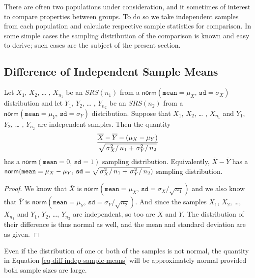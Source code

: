 There are often two populations under consideration, and it sometimes
of interest to compare properties between groups. To do so we take
independent samples from each population and calculate respective
sample statistics for comparison. In some simple cases the sampling
distribution of the comparison is known and easy to derive; such cases
are the subject of the present section.

\subsection{Difference of Independent Sample Means}
\label{sec-8-4-1}

\begin{prop}
Let \(X_{1}\), \(X_{2}\), \ldots{} , \(X_{n_{1}}\) be an \(SRS(n_{1})\)
from a
\(\mathsf{norm}(\mathtt{mean}=\mu_{X},\,\mathtt{sd}=\sigma_{X})\)
distribution and let \(Y_{1}\), \(Y_{2}\), \ldots{} , \(Y_{n_{2}}\) be an
\(SRS(n_{2})\) from a
\(\mathsf{norm}(\mathtt{mean}=\mu_{Y},\,\mathtt{sd}=\sigma_{Y})\)
distribution. Suppose that \(X_{1}\), \(X_{2}\), \ldots{} , \(X_{n_{1}}\)
and \(Y_{1}\), \(Y_{2}\), \ldots{} , \(Y_{n_{2}}\) are independent
samples. Then the quantity
\begin{equation}
\label{eq-diff-indep-sample-means}
\frac{\overline{X}-\overline{Y}-(\mu_{X}-\mu_{Y})}{\sqrt{\left.\sigma_{X}^{2}\right/ n_{1}+\left.\sigma_{Y}^{2}\right/ n_{2}}}
\end{equation}
has a \(\mathsf{norm}(\mathtt{mean}=0,\,\mathtt{sd}=1)\) sampling
distribution. Equivalently, \(\overline{X}-\overline{Y}\) has a
\(\mathsf{norm}(\mathtt{mean}=\mu_{X}-\mu_{Y},\,\mathtt{sd}=\sqrt{\left.\sigma_{X}^{2}\right/
n_{1}+\left.\sigma_{Y}^{2}\right/ n_{2}})\) sampling distribution.
\end{prop}

\begin{proof}
We know that \(\overline{X}\) is
\(\mathsf{norm}(\mathtt{mean}=\mu_{X},\,\mathtt{sd}=\sigma_{X}/\sqrt{n_{1}})\)
and we also know that \(\overline{Y}\) is
\(\mathsf{norm}(\mathtt{mean}=\mu_{Y},\,\mathtt{sd}=\sigma_{Y}/\sqrt{n_{2}})\). And
since the samples \(X_{1}\), \(X_{2}\), \ldots{}, \(X_{n_{1}}\) and
\(Y_{1}\), \(Y_{2}\), \ldots{}, \(Y_{n_{2}}\) are independent, so too are
\(\overline{X}\) and \(\overline{Y}\). The distribution of their
difference is thus normal as well, and the mean and standard deviation
are as given.
\end{proof}

\begin{rem}
Even if the distribution of one or both of the samples is not normal,
the quantity in Equation \eqref{eq-diff-indep-sample-means} will be
approximately normal provided both sample sizes are large.
\end{rem}

